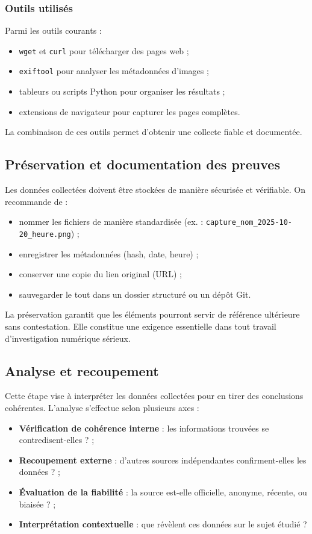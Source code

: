 \documentclass[12pt,a4paper]{report}
\begin{document}
	\subsubsection{Outils utilisés}
	Parmi les outils courants :
	\begin{itemize}
		\item \texttt{wget} et \texttt{curl} pour télécharger des pages web ;
		\item \texttt{exiftool} pour analyser les métadonnées d’images ;
		\item tableurs ou scripts Python pour organiser les résultats ;
		\item extensions de navigateur pour capturer les pages complètes.
	\end{itemize}
	La combinaison de ces outils permet d’obtenir une collecte fiable et documentée.
	
	\subsection{Préservation et documentation des preuves}
	Les données collectées doivent être stockées de manière sécurisée et vérifiable. On recommande de :
	\begin{itemize}
		\item nommer les fichiers de manière standardisée (ex. : \texttt{capture\_nom\_2025-10-20\_heure.png}) ;
		\item enregistrer les métadonnées (hash, date, heure) ;
		\item conserver une copie du lien original (URL) ;
		\item sauvegarder le tout dans un dossier structuré ou un dépôt Git.
	\end{itemize}
	La préservation garantit que les éléments pourront servir de référence ultérieure sans contestation. Elle constitue une exigence essentielle dans tout travail d’investigation numérique sérieux.
	
	\subsection{Analyse et recoupement}
	Cette étape vise à interpréter les données collectées pour en tirer des conclusions cohérentes.  
	L’analyse s’effectue selon plusieurs axes :
	\begin{itemize}
		\item \textbf{Vérification de cohérence interne} : les informations trouvées se contredisent-elles ? ;
		\item \textbf{Recoupement externe} : d’autres sources indépendantes confirment-elles les données ? ;
		\item \textbf{Évaluation de la fiabilité} : la source est-elle officielle, anonyme, récente, ou biaisée ? ;
		\item \textbf{Interprétation contextuelle} : que révèlent ces données sur le sujet étudié ?
	\end{itemize}
	
\end{document}

